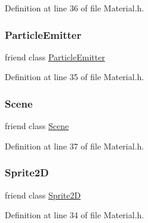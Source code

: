 Definition at line 36 of file Material.\+h.

\mbox{\label{classnjli_1_1_material_a82b374d797a09668286ac5cf26f539f3}} 
\subsubsection{\texorpdfstring{Particle\+Emitter}{ParticleEmitter}}
{\footnotesize\ttfamily friend class \mbox{\hyperlink{classnjli_1_1_particle_emitter}{Particle\+Emitter}}\hspace{0.3cm}{\ttfamily [friend]}}



Definition at line 35 of file Material.\+h.

\mbox{\label{classnjli_1_1_material_a032858ae1fe02d2d1170981c2af2d67c}} 
\subsubsection{\texorpdfstring{Scene}{Scene}}
{\footnotesize\ttfamily friend class \mbox{\hyperlink{classnjli_1_1_scene}{Scene}}\hspace{0.3cm}{\ttfamily [friend]}}



Definition at line 37 of file Material.\+h.

\mbox{\label{classnjli_1_1_material_ac1e5ab02d2359e991783010c562791e4}} 
\subsubsection{\texorpdfstring{Sprite2D}{Sprite2D}}
{\footnotesize\ttfamily friend class \mbox{\hyperlink{classnjli_1_1_sprite2_d}{Sprite2D}}\hspace{0.3cm}{\ttfamily [friend]}}



Definition at line 34 of file Material.\+h.

